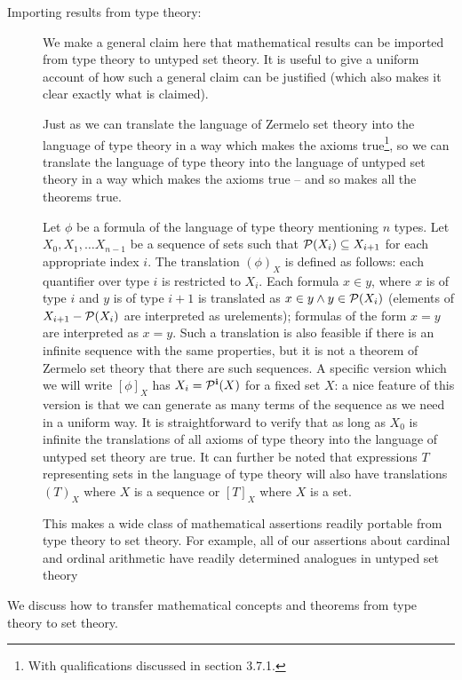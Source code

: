 \documentclass[12pt]{book}
\begin{document}
\begin{description}

\item[Importing results from type theory:]
We make a general claim here that mathematical results can be imported
from type theory to untyped set theory.  It is useful to give a
uniform account of how such a general claim can be justified (which
also makes it clear exactly what is claimed).

Just as we can translate the language of Zermelo set theory into the
language of type theory in a way which makes the axioms true\footnote{With qualifications discussed in section 3.7.1.}, so we
can translate the language of type theory into the language of untyped
set theory in a way which makes the axioms true -- and so makes all
the theorems true.

Let $\phi$ be a formula of the language of type theory mentioning $n$
types.  Let $X_0,X_1,\ldots X_{n-1}$ be a sequence of sets such that
${\cal P}(X_i) \subseteq X_{i+1}$ for each appropriate index $i$.  The
translation $(\phi)_X$ is defined as follows: each quantifier over
type $i$ is restricted to $X_i$.  Each formula $x \in y$, where $x$ is
of type $i$ and $y$ is of type $i+1$ is translated as $x \in y \wedge
y \in {\cal P}(X_{i})$ (elements of $X_{i+1} - {\cal P}(X_i)$ are
interpreted as urelements); formulas of the form $x=y$ are interpreted
as $x=y$.  Such a translation is also feasible if there is an infinite
sequence with the same properties, but it is not a theorem of Zermelo
set theory that there are such sequences.  A specific version which we
will write $[\phi]_X$ has $X_i = {\cal P}^{\bf i}(X)$ for a fixed set
$X$: a nice feature of this version is that we can generate as many
terms of the sequence as we need in a uniform way.  It is
straightforward to verify that as long as $X_0$ is infinite the
translations of all axioms of type theory into the language of untyped
set theory are true.  It can further be noted that expressions $T$
representing sets in the language of type theory will also have
translations $(T)_X$ where $X$ is a sequence or $[T]_X$ where $X$ is a
set.

This makes a wide class of mathematical assertions readily portable
from type theory to set theory.  For example, all of our assertions
about cardinal and ordinal arithmetic have readily determined
analogues in untyped set theory
\end{description}


We discuss how to transfer mathematical concepts and theorems from
type theory to set theory.
\end{document}
